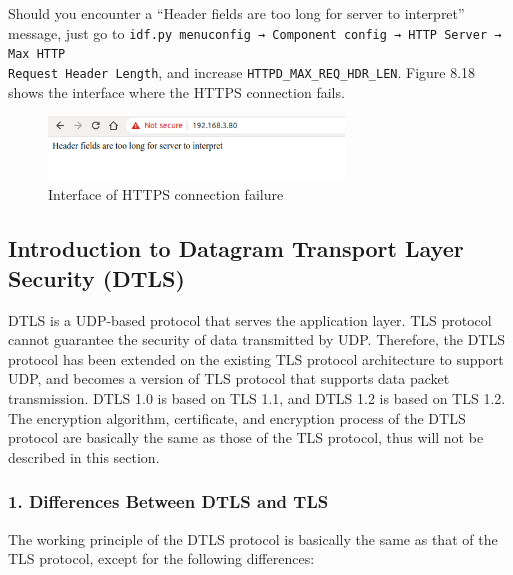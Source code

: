 \documentclass[a4paper,12pt,openany]{book}
\begin{document}
Should you encounter a “Header fields are too long for server to interpret” message, just go to \verb|idf.py menuconfig → Component config → HTTP Server → Max HTTP |\\ \verb|Request Header Length|, and increase \verb|HTTPD_MAX_REQ_HDR_LEN|. Figure 8.18 shows the interface where the HTTPS connection fails.

\begin{figure}[!h]
    \centering
    \includegraphics[width=0.7\textwidth,frame]{D8Z/8-18}
    \caption{Interface of HTTPS connection failure}
\end{figure}

\subsection{Introduction to Datagram Transport Layer Security (DTLS)}
DTLS is a UDP-based protocol that serves the application layer. TLS protocol cannot guarantee the security of data transmitted by UDP. Therefore, the DTLS protocol has been extended on the existing TLS protocol architecture to support UDP, and becomes a version of TLS protocol that supports data packet transmission. DTLS 1.0 is based on TLS 1.1, and DTLS 1.2 is based on TLS 1.2. The encryption algorithm, certificate, and encryption process of the DTLS protocol are basically the same as those of the TLS protocol, thus will not be described in this section.

\subsubsection{1. Differences Between DTLS and TLS}
The working principle of the DTLS protocol is basically the same as that of the TLS protocol, except for the following differences:
\end{document}
